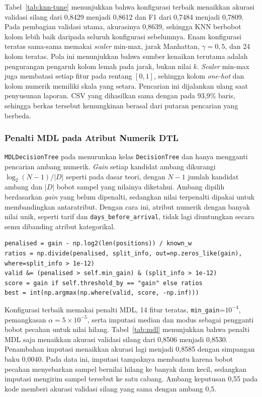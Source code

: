 Tabel~\ref{tab:knn-tune} menunjukkan bahwa konfigurasi terbaik menaikkan akurasi validasi silang dari 0,8429 menjadi 0,8612 dan F1 dari 0,7484 menjadi 0,7809. Pada pembagian validasi utama, akurasinya 0,8639, sehingga KNN berbobot kolom lebih baik daripada seluruh konfigurasi sebelumnya. Enam konfigurasi teratas sama-sama memakai \textit{scaler} min-max, jarak Manhattan, $\gamma=0{,}5$, dan 24 kolom teratas. Pola ini menunjukkan bahwa sumber kenaikan terutama adalah pengurangan pengaruh kolom lemah pada jarak, bukan nilai $k$. \textit{Scaler} min-max juga membatasi setiap fitur pada rentang $[0,1]$, sehingga kolom \textit{one-hot} dan kolom numerik memiliki skala yang setara. Pencarian ini dijalankan ulang saat penyusunan laporan. CSV yang dihasilkan sama dengan  pada 93,9\% baris, sehingga berkas tersebut kemungkinan berasal dari putaran pencarian yang berbeda.

\subsubsection{Penalti MDL pada Atribut Numerik DTL}
\texttt{MDLDecisionTree} pada  menurunkan kelas \texttt{DecisionTree} dan hanya mengganti pencarian ambang numerik. \textit{Gain} setiap kandidat ambang dikurangi $\log_2(N-1)/|D|$ seperti pada dasar teori, dengan $N-1$ jumlah kandidat ambang dan $|D|$ bobot sampel yang nilainya diketahui. Ambang dipilih berdasarkan \textit{gain} yang belum dipenalti, sedangkan nilai terpenalti dipakai untuk membandingkan antaratribut. Dengan cara ini, atribut numerik dengan banyak nilai unik, seperti tarif dan \texttt{days\_before\_arrival}, tidak lagi diuntungkan secara semu dibanding atribut kategorikal.

\begin{lstlisting}[caption={Penalti MDL pada \textit{gain} ambang numerik (\texttt{src/dtl\_tuning.py}, diringkas)},label={lst:mdl}]
penalised = gain - np.log2(len(positions)) / known_w
ratios = np.divide(penalised, split_info, out=np.zeros_like(gain), where=split_info > 1e-12)
valid &= (penalised > self.min_gain) & (split_info > 1e-12)
score = gain if self.threshold_by == "gain" else ratios
best = int(np.argmax(np.where(valid, score, -np.inf)))
\end{lstlisting}

Konfigurasi terbaik memakai penalti MDL, 14 fitur teratas, \texttt{min\_gain}=$10^{-4}$, pemangkasan $\alpha=5\times10^{-5}$, serta imputasi median dan modus sebagai pengganti bobot pecahan untuk nilai hilang. Tabel~\ref{tab:mdl} menunjukkan bahwa penalti MDL saja menaikkan akurasi validasi silang dari 0,8506 menjadi 0,8530. Penambahan imputasi menaikkan akurasi lagi menjadi 0,8585 dengan simpangan baku 0,0040. Pada data ini, imputasi tampaknya membantu karena bobot pecahan menyebarkan sampel bernilai hilang ke banyak daun kecil, sedangkan imputasi mengirim sampel tersebut ke satu cabang. Ambang keputusan 0,55 pada kode memberi akurasi validasi silang yang sama dengan ambang 0,5.

